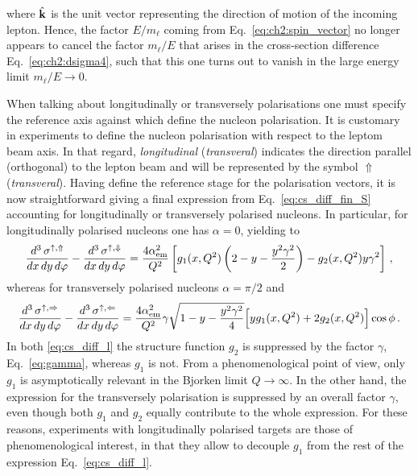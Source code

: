 where $\hat{\vb{k}}$ is the unit vector representing the direction of motion of the incoming lepton. Hence, the factor $E/m_{\ell}$ coming from Eq.~\eqref{eq:ch2:spin_vector} no longer appears to cancel the factor $m_{\ell}/E$ that arises in the cross-section difference Eq.~\eqref{eq:ch2:dsigma4}, such that this one turns out to vanish in the large energy limit $m_{\ell}/E \rightarrow 0$. \par
When talking about longitudinally or transversely polarisations one must specify the reference axis against which define the nucleon polarisation. It is customary in experiments to define the nucleon polarisation with respect to the leptom beam axis. In that regard, \textit{longitudinal} (\textit{transveral}) indicates the direction parallel (orthogonal) to the lepton beam and will be represented by the symbol $\Uparrow$ (\textit{transveral}). Having define the reference stage for the polarisation vectors, it is now straightforward giving a final expression from Eq.~\eqref{eq:cs_diff_fin_S} accounting for longitudinally or transversely polarised nucleons. In particular, for longitudinally polarised nucleons one has $\alpha=0$, yielding to
\begin{equation}
  \frac{d^3 \, \sigma^{\uparrow, \Uparrow}}{dx \, dy \, d\varphi} - \frac{d^3 \, \sigma^{\uparrow, \Downarrow}}{dx \, dy \, d\varphi} = \frac{4 \alpha_{\textrm{em}}^2}{Q^2}  \left[ g_1(x,Q^2) \left( 2 - y - \frac{y^2 \gamma^2}{2} \right) - g_2(x,Q^2) y \gamma^2 \right] \,,
  \label{eq:cs_diff_l}
\end{equation}
whereas for transversely polarised nucleons $\alpha=\pi/2$ and
\begin{equation}
  \frac{d^3 \, \sigma^{\uparrow, \Rightarrow}}{dx \, dy \, d\varphi} - \frac{d^3 \, \sigma^{\uparrow, \Leftarrow}}{dx \, dy \, d\varphi} = \frac{4 \alpha_{\textrm{em}}^2}{Q^2} \gamma\sqrt{1 - y - \frac{y^2 \gamma^2}{4}}  \Bigl[ y g_1(x,Q^2) + 2 g_2(x,Q^2) \Bigr] \cos \phi\,.
  \label{eq:cs_diff_t}
\end{equation}
In both \eqref{eq:cs_diff_l} the structure function $g_2$ is suppressed by the factor $\gamma$, Eq.~\eqref{eq:gamma}, whereas $g_1$ is not. From a phenomenological point of view, only $g_1$ is asymptotically relevant in the Bjorken limit $Q \rightarrow \infty$. In the other hand, the expression for the transversely polarisation is suppressed by an overall factor $\gamma$, even though both $g_1$ and $g_2$ equally contribute to the whole expression. For these reasons, experiments with longitudinally polarised targets are those of phenomenological interest, in that they allow to decouple $g_1$ from the rest of the expression Eq.~\eqref{eq:cs_diff_l}.\par
